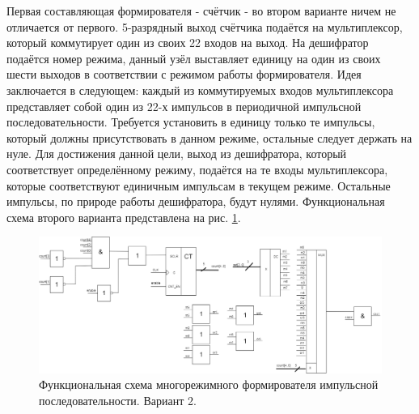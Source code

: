 Первая составляющая формирователя - счётчик - во втором варианте ничем не отличается от первого. 5-разрядный выход счётчика подаётся на мультиплексор, который коммутирует один из своих 22 входов на выход. На дешифратор подаётся номер режима, данный узёл выставляет единицу на один из своих шести выходов в соответствии с режимом работы формирователя. Идея заключается в следующем: каждый из коммутируемых входов мультиплексора представляет собой один из 22-х импульсов в периодичной импульсной последовательности. Требуется установить в единицу только те импульсы, который должны присутствовать в данном режиме, остальные следует держать на нуле. Для достижения данной цели, выход из дешифратора, который соответствует определённому режиму, подаётся на те входы мультиплексора, которые соответствуют единичным импульсам в текущем режиме. Остальные импульсы, по природе работы дешифратора, будут нулями. Функциональная схема второго варианта представлена на рис. \ref{fig:secondnode}.
\begin{figure}
  \includegraphics[scale=0.35]{./second-node.png}
  \caption{Функциональная схема многорежимного формирователя импульсной последовательности. Вариант 2.}
  \label{fig:secondnode}
\end{figure}